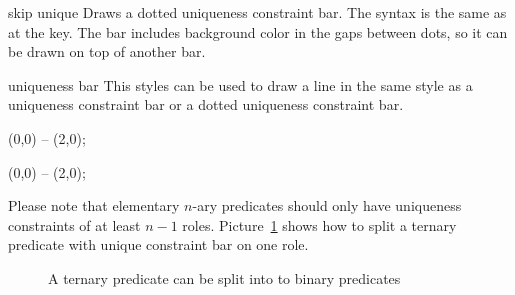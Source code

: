 \documentclass[a4paper,10pt]{article}
\begin{document}
\begin{stylekey}{skip unique}
Draws a dotted uniqueness constraint bar. The syntax is the same as at the  key.
The bar includes background color in the gaps between dots, so it can be drawn on top of 
another bar.
\begin{codeexample}[]
\begin{tikzpicture}
\ternary[unique=1-3,skip unique=2] {};
\end{tikzpicture}
\end{codeexample}
\end{stylekey}

\begin{stylekey}{uniqueness bar}
This styles can be used to draw a line in the same style as a uniqueness constraint bar or a dotted uniqueness constraint bar.
\begin{codeexample}[width=3cm]
\tikz{} (0,0) -- (2,0);
\end{codeexample}
\begin{codeexample}[width=3cm]
\tikz{} (0,0) -- (2,0);
\end{codeexample}
\end{stylekey}

\noindent
Please note that elementary $n$-ary predicates should only have uniqueness constraints of at least $n-1$ roles. Picture~\ref{fig:splitternary} shows how to split a ternary predicate with unique constraint bar on one role.

\begin{figure}[h]
\centering
\begin{codeexample}[]
\end{codeexample}
\caption{A ternary predicate can be split into to binary predicates}
\label{fig:splitternary}
\end{figure}
\end{document}
